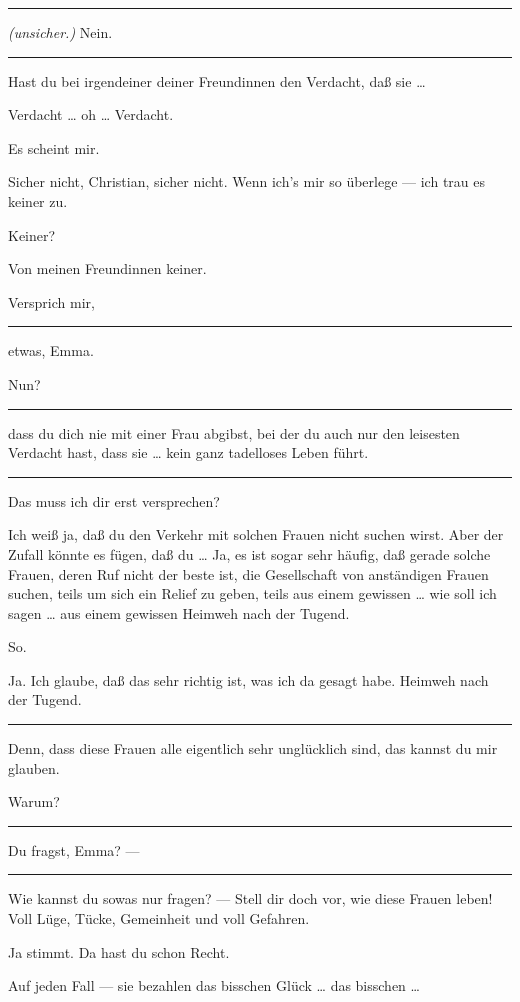 \documentclass[
	final,
	a4paper,
	ngerman,
	mpinclude = true, %
	twoside = true,
	open = right,
	cleardoublepage = plain,
	DIV = 13,
	BCOR = 1cm,
	titlepage = firstiscover,
	]{scrbook}
\newcommand{\direction}[1]{\textit{(#1)}}
\newenvironment{deletion}{%
		\vspace{0.25\baselineskip}
		\hrule
		\vspace{0.25\baselineskip}
		\color{darkgray}
	}{
		\color{black}
		\vspace{0.25\baselineskip}
		\hrule 
		\vspace{0.25\baselineskip}
	}
\newcommand{\thecharacter}[1]{\textup{\textsc{#1}}\xspace}
\newcommand{\thefrau}{\thecharacter{Emma}}
\newcommand{\thegatte}{\thecharacter{Christian}}
\newcommand{\character}[1]{\item[#1:]}
\newcommand{\frau}{\character{\thefrau}}
\newcommand{\gatte}{\character{\thegatte}}
\begin{document}
\begin{play}
\begin{deletion}
	\frau
	\direction{unsicher.} Nein.
	\end{deletion}

	\gatte
	Hast du bei irgendeiner deiner Freundinnen den Verdacht, daß sie \ldots{}

	\frau
	Verdacht \ldots{} oh \ldots{} Verdacht.

	\gatte
	Es scheint mir.

	\frau
	Sicher nicht, Christian, sicher nicht. Wenn ich's mir so überlege --- ich trau es keiner zu.

	\gatte
	Keiner?

	\frau
	Von meinen Freundinnen keiner.

	\gatte
	Versprich mir,
	\begin{deletion}
	etwas, Emma.

	\frau
	Nun?

	\gatte
	\end{deletion}
	dass du dich nie mit einer Frau abgibst, bei der du auch nur den leisesten Verdacht hast, dass sie \ldots{} kein ganz tadelloses Leben führt.
	\begin{deletion}
	\frau
	Das muss ich dir erst versprechen?

	\gatte
	Ich weiß ja, daß du den Verkehr mit solchen Frauen nicht suchen wirst. Aber der Zufall könnte es fügen, daß du \ldots{} Ja, es ist sogar sehr häufig, daß gerade solche Frauen, deren Ruf nicht der beste ist, die Gesellschaft von anständigen Frauen suchen, teils um sich ein Relief zu geben, teils aus einem gewissen \ldots{} wie soll ich sagen \ldots{} aus einem gewissen Heimweh nach der Tugend.

	\frau
	So.

	\gatte
	Ja. Ich glaube, daß das sehr richtig ist, was ich da gesagt habe. Heimweh nach der Tugend.
	\end{deletion}
	Denn, dass diese Frauen alle eigentlich sehr unglücklich sind, das kannst du mir glauben.

	\frau
	Warum?

	\gatte
	\begin{deletion}
	Du fragst, Emma? ---
	\end{deletion}
	Wie kannst du sowas nur fragen? --- Stell dir doch vor, wie diese Frauen leben! Voll Lüge, Tücke, Gemeinheit und voll Gefahren.

	\frau
	Ja stimmt. Da hast du schon Recht.

	\gatte
	Auf jeden Fall --- sie bezahlen das bisschen Glück \ldots{} das bisschen \ldots{}


\end{play}
\end{document}
